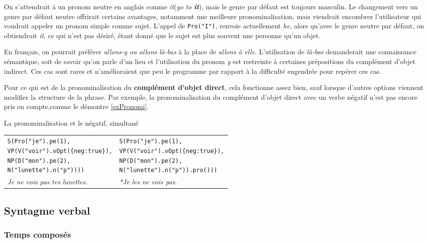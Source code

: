 \documentclass[11pt]{article} %
\newcommand{\real}[1]{\emph{#1}}
\begin{document}
On s'attendrait à un pronom\emph{
}neutre en anglais comme \emph{it}(\emph{go to \textbf{it}}), mais le genre par défaut est toujours
masculin. Le changement vers un genre par défaut neutre offrirait certains avantages, 
notamment une meilleure pronominalisation, mais viendrait encombrer l'utilisateur
qui voudrait appeler un pronom simple comme sujet. L'appel de \texttt{Pro("I")}, renvoie 
actuellement \emph{he}, alors qu'avec le genre neutre par défaut, on obtiendrait \emph{it},
ce qui n'est pas désiré, étant donné que le sujet est plus souvent une personne qu'un objet.

En français, on pourrait préférer \emph{allons-y ou allons
là-bas} à la place de \emph{allons à elle}. L'utilisation de \emph{là-bas} demanderait une connaissance sémantique,
soit de savoir qu'on parle d'un lieu et l'utilisation du pronom \emph{y}
est restreinte à certaines prépositions du complément d'objet indirect.
Ces cas sont rares et n'amélioraient que peu le programme par rapport à la difficulté
engendrée pour repérer ces cas. 

Pour ce qui est de la pronominalisation du \textbf{complément d'objet
direct}, cela fonctionne assez bien, sauf lorsque d'autres options viennent
modifier la structure de la phrase. Par exemple, la pronominalisation du complément
d'objet direct avec un verbe négatif n'est pas encore pris en compte,comme le démontre
\autoref{exPronomi}.
\begin{example}
\centering
\caption{La pronominalisation et le négatif, simultané}
\begin{tabular}{p{8cm} p{8cm}}
\begin{alltt}
S(Pro("je").pe(1),
  VP(V("voir").vOpt(\{neg:true\}),
     NP(D("mon").pe(2),
        N("lunette").n("p"))))
\end{alltt} &
\begin{alltt}
S(Pro("je").pe(1),
  VP(V("voir").vOpt(\{neg:true\}),
     NP(D("mon").pe(2),
        N("lunette").n("p")).pro()))
\end{alltt} \\
\real{Je ne vois pas tes lunettes.} & \real{*Je les ne vois pas.}
\end{tabular}
\label{exPronomi}
\end{example}

\subsection{Syntagme verbal}

\subsubsection{Temps composés}
\end{document}
